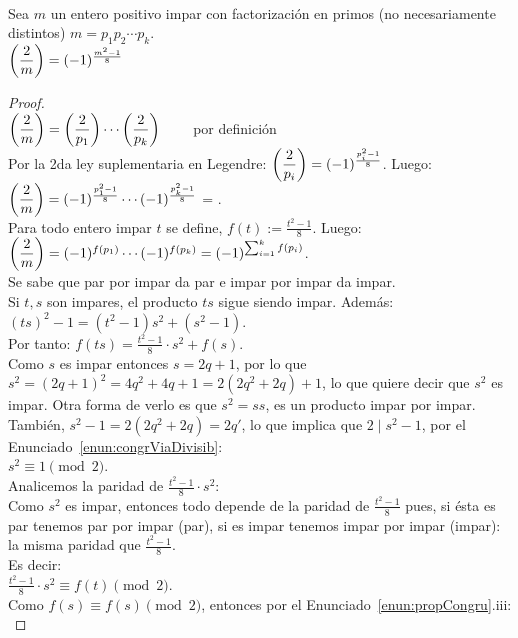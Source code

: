 \begin{enunciado} \, \\
Sea $m$ un entero positivo impar con factorización en primos (no necesariamente distintos) $m=p_1p_2\cdots p_k$. \\
$\left(\dfrac{2}{m}\right) = (-1)^{\frac{m^2-1}{8}}$
\end{enunciado}

\begin{proof} \, \\
$\left(\dfrac{2}{m}\right) = \left(\dfrac{2}{p_1}\right) \cdots \left(\dfrac{2}{p_k}\right) \qquad$ por definición \\
Por la 2da ley suplementaria en Legendre: $\left(\dfrac{2}{p_i}\right) = (-1)^{\frac{p_i^2-1}{8}}$. Luego: \\
$\left(\dfrac{2}{m}\right) = (-1)^{\frac{p_1^2-1}{8}} \cdots (-1)^{\frac{p_k^2-1}{8}}$ = . \\
Para todo entero impar $t$ se define, $f(t) := \frac{t^2 - 1}{8}$. Luego: \\
$\left(\dfrac{2}{m}\right) = (-1)^{f(p_1)}  \cdots (-1)^{f(p_k)}= (-1)^{\sum_{i=1}^k f(p_i)}$. \\
Se sabe que par por impar da par e impar por impar da impar. \\
Si $t,s$ son impares, el producto $ts$ sigue siendo impar. Además: $(ts)^2 - 1 = (t^2 - 1)s^2 + (s^2 - 1)$. \\
Por tanto: $f(ts) = \frac{t^2 - 1}{8}\cdot s^2 + f(s)$. \\
Como $s$ es impar entonces $s = 2q+1$, por lo que $s^2 = (2q+1)^2 = 4q^2 + 4q +1 = 2(2q^2+2q)+1$, lo que quiere decir que $s^2$ es impar. Otra forma de verlo es que $s^2 = ss$, es un producto impar por impar. \\
También, $s^2 - 1 = 2(2q^2+2q) = 2q'$, lo que implica que $2 \mid s^2 - 1$, por el Enunciado~\ref{enun:congrViaDivisib}: \\
$s^2 \equiv 1 \pmod 2$. \\
Analicemos la paridad de $\frac{t^2 - 1}{8}\cdot s^2$: \\
Como $s^2$ es impar, entonces todo depende de la paridad de $\frac{t^2 - 1}{8}$ pues, si ésta es par tenemos par por impar (par), si es impar tenemos impar por impar (impar): la misma paridad que $\frac{t^2 - 1}{8}$. \\
Es decir: \\
$\frac{t^2 - 1}{8}\cdot s^2 \equiv f(t) \pmod{2}$. \\
Como  $f(s) \equiv f(s) \pmod{2}$, entonces por el Enunciado~\ref{enun:propCongru}.iii: \\

\end{proof}
